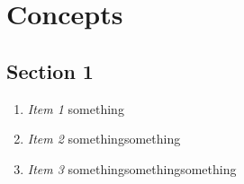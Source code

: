 
\chapter{Concepts}
\label{sec:concepts}


\section{Section 1}

\begin{enumerate}
 \item \textit{Item 1} something
 \item \textit{Item 2} somethingsomething
 \item \textit{Item 3} somethingsomethingsomething
\end{enumerate}
